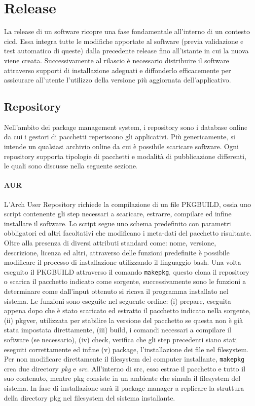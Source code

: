 
\section{Release}
La release di un software ricopre una fase fondamentale all'interno di un contesto \ac{cicd}. Essa integra tutte le modifiche apportate al software (previa validazione e test automatico di queste) dalla precedente release fino all'istante in cui la nuova viene creata. Successivamente al rilascio è necessario distribuire il software attraverso supporti di installazione adeguati e diffonderlo efficacemente per assicurare all'utente l'utilizzo della versione più aggiornata dell'applicativo.

\subsection{Repository}
Nell'ambito dei package management system, i repository sono i database online da cui i gestori di pacchetti reperiscono gli applicativi. Più genericamente, si intende un qualsiasi archivio online da cui è possibile scaricare software. Ogni repository supporta tipologie di pacchetti e modalità di pubblicazione differenti, le quali sono discusse nella seguente sezione.

\paragraph{AUR} L'Arch User Repository richiede la compilazione di un file PKGBUILD, ossia uno script contenente gli step necessari a scaricare, estrarre, compilare ed infine installare il software. Lo script segue uno schema predefinito con parametri obbligatori ed altri facoltativi che modificano i meta-dati del pacchetto risultante. Oltre alla presenza di diversi attributi standard come: nome, versione, descrizione, licenza ed altri, attraverso delle funzioni predefinite è possibile modificare il processo di installazione utilizzando il linguaggio bash. Una volta eseguito il PKGBUILD attraverso il comando \texttt{makepkg}, questo clona il repository o scarica il pacchetto indicato come sorgente, successivamente sono le funzioni a determinare come dall'input ottenuto si ricava il programma installato nel sistema.
Le funzioni sono eseguite nel seguente ordine: (i) prepare, eseguita appena dopo che è stato scaricato ed estratto il pacchetto indicato nella sorgente, (ii) pkgver, utilizzata per stabilire la versione del pacchetto se questa non è già stata impostata direttamente, (iii) build, i comandi necessari a compilare il software (se necessario), (iv) check, verifica che gli step precedenti siano stati eseguiti correttamente ed infine (v) package, l'installazione dei file nel filesystem. Per non modificare direttamente il filesystem del computer installante, \texttt{makepkg} crea due directory \textit{pkg} e \textit{src}. All'interno di src, esso estrae il pacchetto e tutto il suo contenuto, mentre pkg consiste in un ambiente che simula il filesystem del sistema. In fase di installazione sarà il package manager a replicare la struttura della directory pkg nel filesystem del sistema installante.

